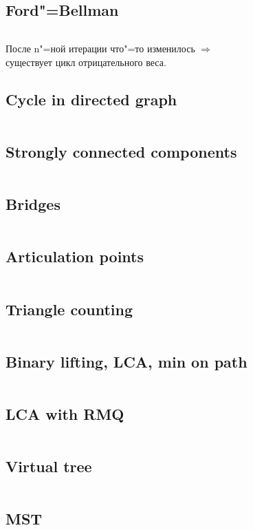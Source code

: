 ﻿\documentclass[10pt,twocolumn,oneside]{article}
\begin{document}
\subsection{Ford"=Bellman}
\inputminted[breaklines]{python}{Graph algorithms/ford-bellman.py}
После n"=ной итерации что"=то изменилось $\Rightarrow$ \\
существует цикл отрицательного веса.
\subsection{Cycle in directed graph}
\inputminted[breaklines]{cpp}{Graph algorithms/cycle in directed graph.cpp}
\subsection{Strongly connected components}
\inputminted[breaklines]{cpp}{Graph algorithms/strongly connected components.cpp}
\subsection{Bridges}
\inputminted[breaklines]{cpp}{Graph algorithms/bridges.cpp}
\subsection{Articulation points}
\inputminted[breaklines]{cpp}{Graph algorithms/articulation points.cpp}
\subsection{Triangle counting}
\inputminted[breaklines]{cpp}{Graph algorithms/triangles.cpp}
\subsection{Binary lifting, LCA, min on path}
\inputminted[breaklines]{cpp}{Graph algorithms/binary lifting + lca + min on path.cpp}
\subsection{LCA with RMQ}
\inputminted[breaklines]{cpp}{Graph algorithms/lca with rmq.cpp}
\subsection{Virtual tree}
\inputminted[breaklines]{cpp}{Graph algorithms/virtual tree.cpp}
\subsection{MST}
\inputminted[breaklines]{cpp}{Graph algorithms/mst.cpp}
\end{document}
